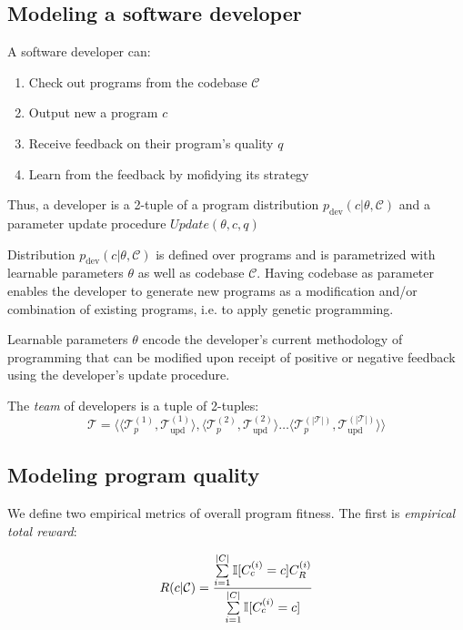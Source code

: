 \subsection{Modeling a software developer}
\label{sec:developer}

A software developer can:
\begin{enumerate}
    \item Check out programs from the codebase $\mathcal{C}$
    \item Output new a program $c$
    \item Receive feedback on their program's quality $q$ 
    \item Learn from the feedback by mofidying its strategy
\end{enumerate}

Thus, a developer is a 2-tuple of a program distribution $p_\text{dev}(c | \theta, \mathcal{C})$ and a parameter update procedure $\mathit{Update}(\theta, c, q)$

Distribution $p_{\text{dev}}(c | \theta, \mathcal{C})$ is defined over programs and is parametrized with learnable parameters $\theta$ as well as codebase $\mathcal{C}$. 
Having codebase as parameter enables the developer to generate new programs as a modification and/or combination of existing programs, i.e. to apply genetic programming.

Learnable parameters $\theta$ encode the developer's current methodology of programming that can be modified upon receipt of positive or negative feedback using the developer's update procedure. 

The \emph{team} of developers is a tuple of 2-tuples:
\begin{equation}
    \mathcal{T} = \langle \langle \mathcal{T}_p^{(1)}, \mathcal{T}_\text{upd}^{(1)} \rangle, \langle \mathcal{T}_p^{(2)}, \mathcal{T}_\text{upd}^{(2)} \rangle \dots \langle \mathcal{T}_p^{(|\mathcal{T}|)}, \mathcal{T}_\text{upd}^{(|\mathcal{T}|)} \rangle \rangle
\end{equation}

\newpage \subsection{Modeling program quality}
\label{sec:quality}

We define two empirical metrics of overall program fitness.
The first is \emph{empirical total reward}:

\begin{equation}
    R(c|\mathcal{C}) = \frac{\sum\limits_{i=1}^{|C|} \mathbb{I}[C_c^{(i)}=c] C_R^{(i)}}{\sum\limits_{i=1}^{|C|} \mathbb{I}[C_c^{(i)}=c]}
\end{equation}

